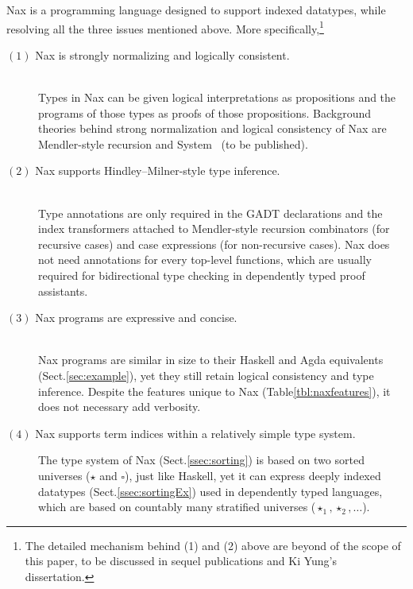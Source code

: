Nax is a programming language designed to support indexed datatypes,
while resolving all the three issues mentioned above.
More specifically,\footnote{
The detailed mechanism behind (1) and (2) above are beyond of the scope of
this paper, to be discussed in sequel publications and Ki Yung's dissertation.}
\begin{description}
\item[$(1)$ Nax is strongly normalizing and logically consistent.]~\\
Types in Nax can be given logical interpretations as propositions
and the programs of those types as proofs of those propositions.
Background theories behind strong normalization and logical consistency of Nax
are Mendler-style recursion \cite{AhnShe11} and System \Fi\ (to be published).

\item[$(2)$ Nax supports Hindley--Milner-style type inference.]~\\
Type annotations are only required in the GADT declarations and
the index transformers attached to Mendler-style recursion combinators
(for recursive cases) and case expressions (for non-recursive cases).
Nax does not need annotations for every top-level functions, which are usually
required for bidirectional type checking in dependently typed proof assistants.

\item[$(3)$ Nax programs are expressive and concise.]~\\
Nax programs are similar in size to their Haskell and Agda equivalents
(Sect.\;\ref{sec:example}), yet they still retain logical consistency
and type inference. Despite the features unique to Nax
(Table\;\ref{tbl:naxfeatures}), it does not necessary add verbosity.

\item[$(4)$ Nax supports term indices within a relatively simple type system.]
The type system of Nax (Sect.\;\ref{ssec:sorting}) is based on
two sorted universes ($\star$ and $\square$), just like Haskell,
yet it can express deeply indexed datatypes (Sect.\;\ref{ssec:sortingEx})
used in dependently typed languages, which are based on countably many
stratified universes ($\star_1,\star_2,\dots$).
\end{description}

